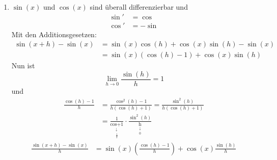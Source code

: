 \begin{enumerate}
\begin{align*}
&\le \abs{h}\exp \left(h\right)
\end{align*}
Woraus
\[\lim_{\substack{h \to 0 \\ h\not  = 0}}{\frac{\exp \left( h \right) - 1}{h}} = 1\]
und somit
\begin{align*}
\exp' \left( {x_0} \right) &= \lim_{\substack{h \to 0 \\ h \not  = 0}}{\frac{\exp \left( {{x_0} + h} \right) - \exp \left( {x_0} \right)}{h}} \\
&= \lim_{h \to 0}{\exp \left( {x_0}\right)} \left( {\frac{\exp \left( h \right) - 1}{h}} \right) \\
&= \exp \left( {x_0} \right)
\end{align*}
folgt
\item $\sin(x)$ und $\cos(x)$ sind überall differenzierbar und
\begin{align*}
\sin'&=\cos\\
\cos'&=-\sin
\end{align*}
Mit den Additionsgesetzen:
\begin{align*}
\sin \left( {x + h} \right) - \sin \left( x \right) &= \sin \left( x \right)\cos \left( h \right) + \cos \left( x \right)\sin \left( h \right) - \sin \left( x \right)\\
& = \sin \left( x \right)\left( {\cos \left( h \right) - 1} \right) + \cos \left( x \right)\sin \left( h \right)
\end{align*}
Nun ist
\[\mathop {\lim }\limits_{h \to 0} \frac{{\sin \left( h \right)}}{h} = 1\]
und
\begin{align*}
\frac{{\cos \left( h \right) - 1}}{h} &= \frac{{{{\cos }^2}\left( h \right) - 1}}{{h\left( {\cos \left( h \right) + 1} \right)}} = \frac{{{{\sin }^2}\left( h \right)}}{{h\left( {\cos \left( h \right) + 1} \right)}}\\
& = \frac{1}{{\mathop {\cos \left( h \right) + 1}\limits_{\begin{array}{*{20}{c}}
 \downarrow \\
{\frac{1}{2}}
\end{array}} }} \cdot \frac{{{{\sin }^2}\left( h \right)}}{{\mathop h\limits_{\begin{array}{*{20}{c}}
 \downarrow \\
0
\end{array}} }}
\end{align*}
\begin{align*}
\frac{{\sin \left( {x + h} \right) - \sin \left( x \right)}}{h} &= \sin \left( x \right)\left( {\frac{{\cos \left( h \right) - 1}}{h}} \right) + \cos \left( x \right)\frac{{\sin \left( h \right)}}{h}\\

\end{align*}
\end{enumerate}
